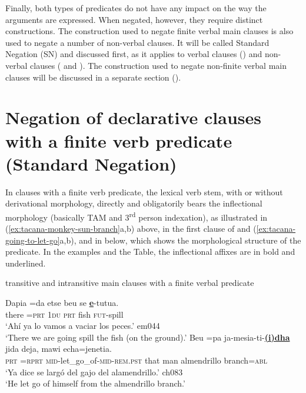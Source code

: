 \documentclass[output=paper]{langsci/langscibook}
\begin{document}
Finally, both types of predicates do not have any impact on the way the
arguments are expressed. When negated, however, they require distinct
constructions. The construction used to negate finite verbal main clauses
is also used to negate a number of non-verbal clauses. It will be called
Standard Negation (SN) and discussed first, as it applies to
verbal clauses () and non-verbal clauses ( and ). The construction used to negate non-finite verbal main clauses will be discussed in a separate section ().

\section{Negation of declarative clauses with a finite verb predicate (Standard Negation)}\label{sec:tacana-3}

In clauses with a finite verb predicate, the lexical verb stem,
with or without derivational morphology, directly and obligatorily bears
the inflectional morphology (basically TAM and 3\textsuperscript{rd} person
indexation), as illustrated in (\ref{ex:tacana-monkey-sun-branch}a,b)
above, in the first clause of  and
(\ref{ex:tacana-going-to-let-go}a,b), and in  below, which shows the morphological structure of the predicate. In the examples and the Table, the inflectional affixes are in bold and underlined.

\begin{exe}\ex\label{ex:tacana-going-to-let-go}  transitive and intransitive main clauses with a finite verbal predicate
\begin{xlist}
\ex\label{ex:tacana-going-to-spill}
 \gll Dapia  =da  etse  beu se \textbf{\underline{e}}-tutua.\\
there  =\textsc{prt}  1\textsc{du}  \textsc{prt}  fish
\textsc{fut}-spill\\
\glt `Ahí ya lo vamos a vaciar los peces.' em044\\
`There we are going spill the fish (on the ground).'
\ex\label{ex:tacana-let-go}
 \gll Beu  =pa ja-mesia-ti-\textbf{\underline{(i)dha}}
 jida deja, mawi echa=jenetia.\\
    \textsc{prt}  =\textsc{rprt}
    \textsc{mid}-let\_go\_of-\textsc{mid-rem.pst}  that  man almendrillo
    branch=\textsc{abl}\\
\glt `Ya dice se largó del gajo del alamendrillo.' ch083\\
`He let go of himself from the almendrillo branch.'
\end{xlist}\end{exe}
\end{document}
